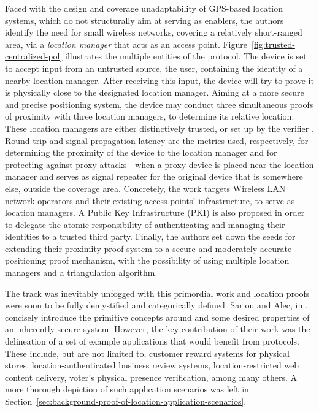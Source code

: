 Faced with the design and coverage unadaptability of GPS-based location systems, which do not structurally aim at serving as \pol{} enablers, the authors identify the need for small wireless networks, covering a relatively short-ranged area, via a \emph{location manager} that acts as an access point. Figure~\ref{fig:trusted-centralized-pol} illustrates the multiple entities of the protocol. The device is set to accept input from an untrusted source, the user, containing the identity of a nearby location manager. After receiving this input, the device will try to prove it is physically close to the designated location manager. Aiming at a more secure and precise positioning system, the device may conduct three simultaneous proofs of proximity with three location managers, to determine its relative location. These location managers are either distinctively trusted, or set up by the verifier \cite{waters2003secure}. Round-trip and signal propagation latency are the metrics used, respectively, for determining the proximity of the device to the location manager and for protecting against proxy attacks~\textemdash~when a proxy device is placed near the location manager and serves as signal repeater for the original device that is somewhere else, outside the coverage area. Concretely, the work targets Wireless LAN network operators and their existing access points' infrastructure, to serve as location managers. A Public Key Infrastructure (PKI) is also proposed in order to delegate the atomic responsibility of authenticating and managing their identities to a trusted third party. Finally, the authors set down the seeds for extending their proximity proof system to a secure and moderately accurate positioning proof mechanism, with the possibility of using multiple location managers and a triangulation algorithm.

The \pol{} track was inevitably unfogged with this primordial work and location proofs were soon to be fully demystified and categorically defined. Sariou and Alec, in \cite{saroiu2009enabling}, concisely introduce the primitive concepts around \pol{} and some desired properties of an inherently secure system. However, the key contribution of their work was the delineation of a set of example applications that would benefit from \pol{} protocols. These include, but are not limited to, customer reward systems for physical stores, location-authenticated business review systems, location-restricted web content delivery, voter's physical presence verification, among many others. A more thorough depiction of such application scenarios was left in Section~\ref{sec:background-proof-of-location-application-scenarios}.

